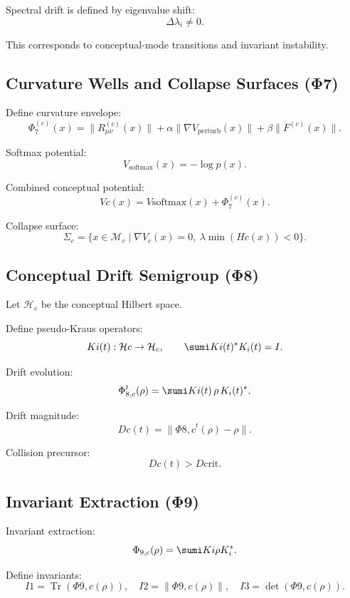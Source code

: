 Spectral drift is defined by eigenvalue shift:
\[
\Delta \lambda_i \neq 0.
\]

This corresponds to conceptual-mode transitions and invariant instability.

\subsection{Curvature Wells and Collapse Surfaces (Φ7)}

Define curvature envelope:
\[
\Phi_7^{(c)}(x)
= \| R^{(c)}_{\mu\nu}(x) \|
+ \alpha \|\nabla V_{\text{perturb}}(x)\|
+ \beta \|F^{(c)}(x)\|.
\]

Softmax potential:
\[
V_{\text{softmax}}(x) = -\log p(x).
\]

Combined conceptual potential:
\[
Vc(x) = V{\text{softmax}}(x) + \Phi_7^{(c)}(x).
\]

Collapse surface:
\[
\Sigma_c
= \{ x \in \mathcal{M}_c
\mid \nabla V_c(x) = 0,\ 
\lambda{\min}(Hc(x)) < 0 \}.
\]

\subsection{Conceptual Drift Semigroup (Φ8)}

Let $\mathcal{H}_c$ be the conceptual Hilbert space.

Define pseudo-Kraus operators:
\[
Ki(t) : \mathcal{H}c \to \mathcal{H}_c,
\qquad
\sumi Ki(t)^\ast K_i(t) = I.
\]

Drift evolution:
\[
\Phi_{8,c}^t(\rho)
= \sumi Ki(t)\,\rho\,K_i(t)^\ast.
\]

Drift magnitude:
\[
Dc(t) = \|\Phi{8,c}^t(\rho) - \rho\|.
\]

Collision precursor:
\[
Dc(t) > D{\text{crit}}.
\]

\subsection{Invariant Extraction (Φ9)}

Invariant extraction:
\[
\Phi_{9,c}(\rho)
= \sumi Ki \rho K_i^\ast.
\]

Define invariants:
\[
I1 = \operatorname{Tr}(\Phi{9,c}(\rho)),
\quad
I2 = \|\Phi{9,c}(\rho)\|,
\quad
I3 = \det(\Phi{9,c}(\rho)).
\]

